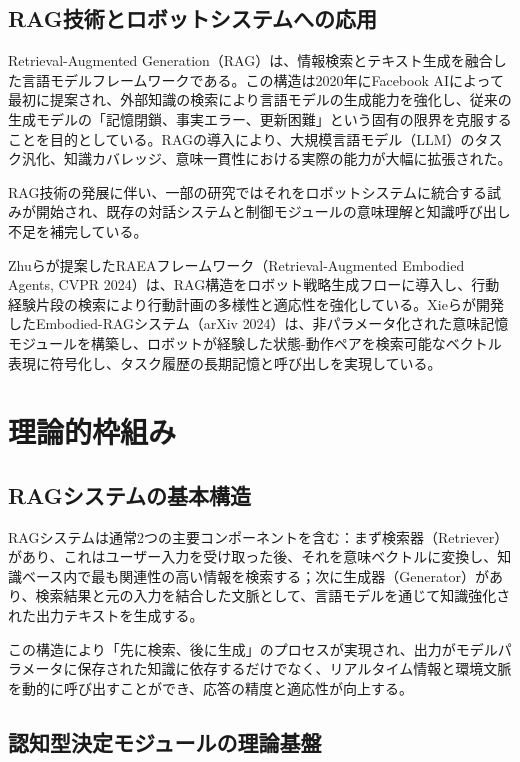 \documentclass[12pt]{report}
\begin{document}
\subsection{RAG技術とロボットシステムへの応用}

Retrieval-Augmented Generation（RAG）は、情報検索とテキスト生成を融合した言語モデルフレームワークである。この構造は2020年にFacebook AIによって最初に提案され、外部知識の検索により言語モデルの生成能力を強化し、従来の生成モデルの「記憶閉鎖、事実エラー、更新困難」という固有の限界を克服することを目的としている。RAGの導入により、大規模言語モデル（LLM）のタスク汎化、知識カバレッジ、意味一貫性における実際の能力が大幅に拡張された。

RAG技術の発展に伴い、一部の研究ではそれをロボットシステムに統合する試みが開始され、既存の対話システムと制御モジュールの意味理解と知識呼び出し不足を補完している。

Zhuらが提案したRAEAフレームワーク（Retrieval-Augmented Embodied Agents, CVPR 2024）は、RAG構造をロボット戦略生成フローに導入し、行動経験片段の検索により行動計画の多様性と適応性を強化している。Xieらが開発したEmbodied-RAGシステム（arXiv 2024）は、非パラメータ化された意味記憶モジュールを構築し、ロボットが経験した状態-動作ペアを検索可能なベクトル表現に符号化し、タスク履歴の長期記憶と呼び出しを実現している。

\section{理論的枠組み}
\label{sec:theoretical_framework}

\subsection{RAGシステムの基本構造}

RAGシステムは通常2つの主要コンポーネントを含む：まず検索器（Retriever）があり、これはユーザー入力を受け取った後、それを意味ベクトルに変換し、知識ベース内で最も関連性の高い情報を検索する；次に生成器（Generator）があり、検索結果と元の入力を結合した文脈として、言語モデルを通じて知識強化された出力テキストを生成する。

この構造により「先に検索、後に生成」のプロセスが実現され、出力がモデルパラメータに保存された知識に依存するだけでなく、リアルタイム情報と環境文脈を動的に呼び出すことができ、応答の精度と適応性が向上する。

\subsection{認知型決定モジュールの理論基盤}
\end{document}
